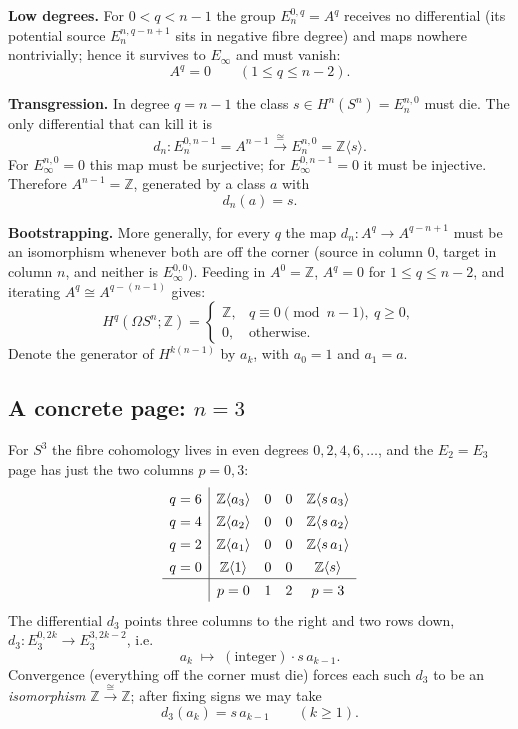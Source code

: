 \documentclass{article}
\newcommand{\Z}{{\mathbb{Z}}}
\begin{document}
\smallskip\noindent\textbf{Low degrees.} For $0<q<n-1$ the group $E_n^{0,q}=A^q$
receives no differential (its potential source $E_n^{n,q-n+1}$ sits in negative
fibre degree) and maps nowhere nontrivially; hence it survives to $E_\infty$ and
must vanish:
\[
  A^q=0\qquad(1\le q\le n-2).
\]

\smallskip\noindent\textbf{Transgression.} In degree $q=n-1$ the class
$s\in H^n(S^n)=E_n^{n,0}$ must die. The only differential that can kill it is
\[
  d_n\colon E_n^{0,n-1}=A^{n-1}\xrightarrow{\ \cong\ }E_n^{n,0}=\Z\langle s\rangle .
\]
For $E_\infty^{n,0}=0$ this map must be surjective; for $E_\infty^{0,n-1}=0$ it
must be injective. Therefore $A^{n-1}=\Z$, generated by a class $a$ with
\begin{equation}\label{eq:transgress}
  d_n(a)=s .
\end{equation}

\smallskip\noindent\textbf{Bootstrapping.} More generally, for every $q$ the map
$d_n\colon A^{q}\to A^{q-n+1}$ must be an isomorphism whenever both are off the
corner (source in column $0$, target in column $n$, and neither is
$E_\infty^{0,0}$). Feeding in $A^0=\Z$, $A^{q}=0$ for $1\le q\le n-2$, and
iterating $A^{q}\cong A^{q-(n-1)}$ gives:
\begin{equation}\label{eq:additive}
  H^{q}(\Omega S^n;\Z)=
  \begin{cases}\Z,& q\equiv 0\pmod{n-1},\ q\ge 0,\\[2pt] 0,&\text{otherwise.}\end{cases}
\end{equation}
Denote the generator of $H^{k(n-1)}$ by $a_k$, with $a_0=1$ and $a_1=a$.

\subsection{A concrete page: $n=3$}

For $S^3$ the fibre cohomology lives in even degrees $0,2,4,6,\dots$, and the
$E_2=E_3$ page has just the two columns $p=0,3$:
\[
\renewcommand{\arraystretch}{1.35}
\begin{array}{c|cccc}
 q=6 & \Z\langle a_3\rangle & 0 & 0 & \Z\langle s\,a_3\rangle \\
 q=4 & \Z\langle a_2\rangle & 0 & 0 & \Z\langle s\,a_2\rangle \\
 q=2 & \Z\langle a_1\rangle & 0 & 0 & \Z\langle s\,a_1\rangle \\
 q=0 & \Z\langle 1\rangle   & 0 & 0 & \Z\langle s\rangle \\ \hline
     & p=0 & 1 & 2 & p=3
\end{array}
\]
The differential $d_3$ points three columns to the right and two rows down,
$d_3\colon E_3^{0,2k}\to E_3^{3,2k-2}$, i.e.
\[
  a_k\;\longmapsto\; (\text{integer})\cdot s\,a_{k-1}.
\]
Convergence (everything off the corner must die) forces each such $d_3$ to be an
\emph{isomorphism} $\Z\xrightarrow{\cong}\Z$; after fixing signs we may take
\begin{equation}\label{eq:d3loop}
  d_3(a_k)=s\,a_{k-1}\qquad(k\ge 1).
\end{equation}
\end{document}
